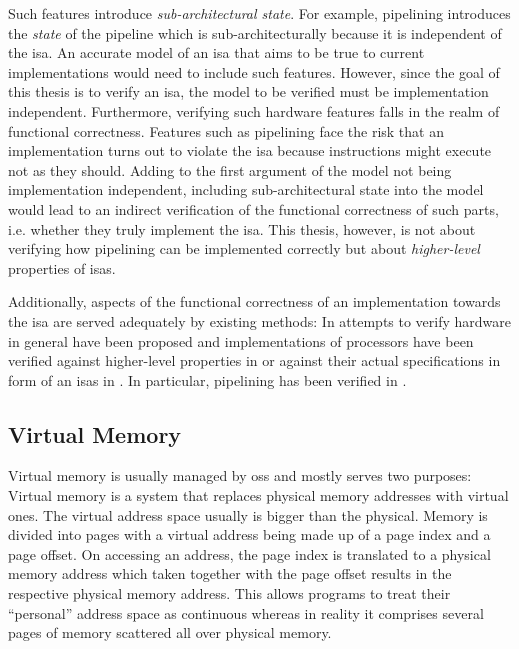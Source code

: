 Such features introduce \textit{sub-architectural state}.
For example, pipelining introduces the \textit{state} of the pipeline which is sub-architecturally because it is independent of the \gls{isa}.
An accurate model of an \gls{isa} that aims to be true to current implementations would need to include such features.
However, since the goal of this thesis is to verify an \gls{isa}, the model to be verified must be implementation independent.
Furthermore, verifying such hardware features falls in the realm of functional correctness.
Features such as pipelining face the risk that an implementation turns out to violate the \gls{isa} because instructions might execute not as they should.
Adding to the first argument of the model not being implementation independent, including sub-architectural state into the model would lead to an indirect verification of the functional correctness of such parts, i.e. whether they truly implement the \gls{isa}.
This thesis, however, is not about verifying how pipelining can be implemented correctly but about \textit{higher-level} properties of \glspl{isa}.

Additionally, aspects of the functional correctness of an implementation towards the \gls{isa} are served adequately by existing methods:
In \cite{Mukherjee16} attempts to verify hardware in general have been proposed and implementations of processors have been verified against higher-level properties in \cite{Zhang15, Beatty94, Berezin98, Trippel19} or against their actual specifications in form of an \glspl{isa} in \cite{Reid16, RISCV-formal}.
In particular, pipelining has been verified in \cite{Burch94}.

\subsection{Virtual Memory}
\label{sec:virtual-memory}

Virtual memory is usually managed by \glspl{os} and mostly serves two purposes: 
Virtual memory is a system that replaces physical memory addresses with virtual ones.
The virtual address space usually is bigger than the physical.
Memory is divided into pages with a virtual address being made up of a page index and a page offset.
On accessing an address, the page index is translated to a physical memory address which taken together with the page offset results in the respective physical memory address.
This allows programs to treat their \enquote{personal} address space as continuous whereas in reality it comprises several pages of memory scattered all over physical memory.

